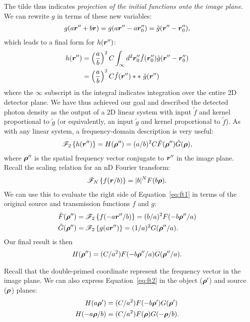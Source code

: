 \documentclass[mphy386-notes.tex]{subfiles}
\begin{document}
The tilde thus indicates \textit{projection of the initial functions onto the image plane}. We
can rewrite $g$ in terms of these new variables: 
\begin{align}
  g(a\boldsymbol{r}'' + b\boldsymbol{r}) = g(a\boldsymbol{r}''-a\boldsymbol{r}_0'') = \tilde{g}(\boldsymbol{r}'' - \boldsymbol{r}_0''),
\end{align}
which leads to a final form for $h(\boldsymbol{r}'')$:
\begin{align}
  h(\boldsymbol{r}'')&=\left(\frac{a}{b}\right)^2 C \int_{\infty} d^2\boldsymbol{r}_0'' \tilde{f}(\boldsymbol{r}_0'')\tilde{g}(\boldsymbol{r}'' - \boldsymbol{r}_0'')\nonumber\\
             &=\left(\frac{a}{b}\right)^2 C \tilde{f}(\boldsymbol{r}'') \ast \ast \text{ } \tilde{g}(\boldsymbol{r}'')
\end{align}
where the $\infty$ subscript in the integral indicates integration over the
entire 2D detector plane. We have thus achieved our goal and described the
detected photon density as the output of a 2D linear system with input
$\tilde{f}$ and kernel proportional to $\tilde{g}$ (or equivalently, an input
$\tilde{g}$ and kernel proportional to $\tilde{f}$). As with any linear system, a
frequency-domain description is very useful:
\begin{align}
  \mathscr{F}_2\left\{h(\boldsymbol{r}'')\right\} = H(\boldsymbol{\rho}'') = (a/b)^2 C \tilde{F}(\boldsymbol{\rho}'')\tilde{G}(\boldsymbol{\rho}),
  \label{eq:ft1}
\end{align}
where $\boldsymbol{\rho}''$ is the spatial frequency vector conjugate to $\boldsymbol{r}''$ in the image plane.
Recall the scaling relation for an nD Fourier transform:
\begin{align}
  \mathscr{F}_N\left\{f(\boldsymbol{r}/b)\right\} = |b|^N F(b\boldsymbol{\rho}).
\end{align}
We can use this to evaluate the right side of Equation~\ref{eq:ft1} in terms of the
original source and transmission functions $f$ and $g$:
\begin{align}
  \tilde{F}(\boldsymbol{\rho}'') &= \mathscr{F}_2\left\{f(-a\boldsymbol{r}''/b)\right\} = (b/a)^2 F(-b\boldsymbol{\rho}''/a)\\
  \tilde{G}(\boldsymbol{\rho}'') &= \mathscr{F}_2\left\{g(a\boldsymbol{r}'')\right\} = (1/a)^2 G(\boldsymbol{\rho}''/a).
\end{align}
Our final result is then
\begin{align}
  H(\boldsymbol{\rho}'') = (C/a^2)F(-b\boldsymbol{\rho}''/a)G(\boldsymbol{\rho}''/a).
  \label{eq:ft2}
\end{align}

Recall that the double-primed coordinate represent the frequency vector
in the image plane. We can also express Equation~\ref{eq:ft2} in the
object ($\boldsymbol{\rho}'$) and source ($\boldsymbol{\rho}$) planes:
\begin{align}
  H(a\boldsymbol{\rho}') &= (C/a^2)F(-b\boldsymbol{\rho}')G(\boldsymbol{\rho}')\\
  H(-a\boldsymbol{\rho}/b) &= (C/a^2)F(\boldsymbol{\rho})G(-\boldsymbol{\rho}/b).
\end{align}
\end{document}
